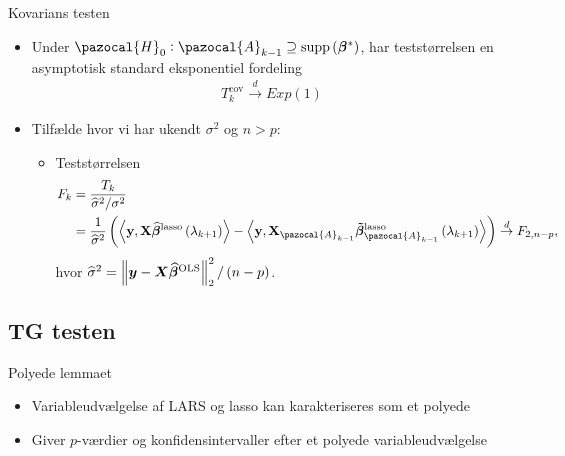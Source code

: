 \begin{frame}{Kovarians testen}
\begin{itemize}
\item Under $\pazocal{H}_0 : \pazocal{A}_{k-1} \supseteq \text{supp} \del{\boldsymbol\beta^*} $, har teststørrelsen en asymptotisk standard eksponentiel fordeling 
\begin{align*}
T_k^{\text{cov}} \overset{d}{\rightarrow} Exp(1)
\end{align*}
\item Tilfælde hvor vi har ukendt $\sigma^2$ og $n>p$: 
\begin{itemize}
\item Teststørrelsen
\begin{align*}
F_k & = \frac{T_k}{\widehat\sigma^2 /\sigma^2} \\
& = \frac{1}{\widehat\sigma^2}\del{ \left\langle \textbf{y}, \textbf{X} \widehat{\boldsymbol{\beta}}^\text{lasso} \del{\lambda_{k+1}} \right\rangle -  \left\langle  \textbf{y}, \textbf{X}_{\pazocal{A}_{k-1}} \boldsymbol{\tilde{\beta}}^\text{lasso}_{\pazocal{A}_{k-1}} \del{\lambda_{k+1}} \right\rangle} \overset{d}{\rightarrow} F_{2,n-p},
\end{align*}
hvor $\widehat{\sigma}^2 = \left\Vert \vy - \vX \boldsymbol{\widehat{\beta}}^\text{OLS} \right\Vert^2_2  / \del{n-p}$.
\end{itemize}
\end{itemize}
\end{frame}

\subsection{TG testen}
\begin{frame}{Polyede lemmaet}
\begin{itemize}
\item Variableudvælgelse af LARS og lasso kan karakteriseres som et polyede
\item Giver $p$-værdier og konfidensintervaller efter et polyede variableudvælgelse
\end{itemize}
\end{frame}

